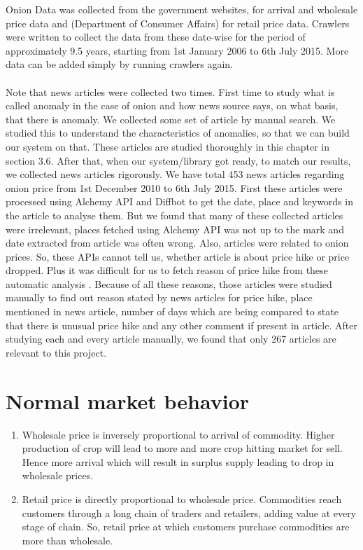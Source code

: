 Onion Data was collected from the government websites,\cite{agmarknet} for arrival and wholesale price data and \cite{retailpricecollection} (Department of Consumer Affairs) for retail price data. Crawlers were written to collect the data from these date-wise for the period of approximately 9.5 years, starting from 1st January 2006 to 6th July 2015. More data can be added simply by running crawlers again.\\
\\
Note that news articles were collected two times. First time to study what is called anomaly in the case of onion and how news source says, on what basis, that there is anomaly. We collected some set of article by manual search. We studied this to understand the characteristics of anomalies, so that we can build our system on that. These articles are studied thoroughly in this chapter in section 3.6. After that, when our system/library got ready, to match our results, we collected news articles rigorously. We have total 453 news articles regarding onion price from 1st December 2010 to 6th July 2015. First these articles were processed using Alchemy API \cite{alchemyapi} and Diffbot \cite{diffbot} to get the date, place and keywords in the article to analyse them. But we found that many of these collected articles were irrelevant, places fetched using Alchemy API was not up to the mark and date extracted from article was often wrong. Also, articles were related to onion prices. So, these APIs cannot tell us, whether article is about price hike or price dropped. Plus it was difficult for us to fetch reason of price hike from these automatic analysis
. Because of all these reasons, those articles were studied manually to find out reason stated by news articles for price hike, place mentioned in news article, number of days which are being compared to state that there is unusual price hike and any other comment if present in article. After studying each and every article manually, we found that only 267 articles are relevant to this project.


\section{Normal market behavior}

\begin{enumerate}

\item Wholesale price is inversely proportional to arrival of commodity. Higher production of crop will lead to more and more crop hitting market for sell. Hence more arrival which will result in surplus supply leading to drop in wholesale prices.

\item  Retail price is directly proportional to wholesale price. Commodities reach customers through a long chain of traders and retailers, adding value at every stage of chain. So, retail price at which customers purchase commodities are more than wholesale.

\end{enumerate}

